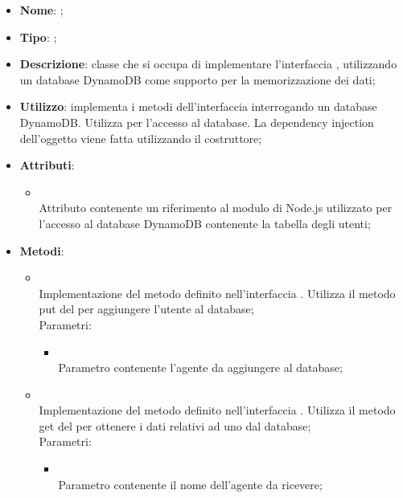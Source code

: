 \begin{itemize}
	\item \textbf{Nome}: ;
	\item \textbf{Tipo}: ;
	\item \textbf{Descrizione}: classe che si occupa di implementare l'interfaccia , utilizzando un database DynamoDB come supporto per la memorizzazione dei dati;
	\item \textbf{Utilizzo}: implementa i metodi dell'interfaccia  interrogando un database DynamoDB. Utilizza  per l'accesso al database. La dependency injection dell'oggetto  viene fatta utilizzando il costruttore;
	\item \textbf{Attributi}:
	\begin{itemize}
		\item[]  \\
		Attributo contenente un riferimento al modulo di Node.js utilizzato per l'accesso al database DynamoDB contenente la tabella degli utenti;
	\end{itemize}
	\item \textbf{Metodi}:
	\begin{itemize}
		\item[]  \\
		Implementazione del metodo definito nell'interfaccia . Utilizza il metodo put del  per aggiungere l'utente al database;\\
		Parametri:
		\begin{itemize}
			\item {} \\
			Parametro contenente l'agente da aggiungere al database;
		\end{itemize}
		\item[]  \\
		Implementazione del metodo definito nell'interfaccia . Utilizza il metodo get del  per ottenere i dati relativi ad uno  dal database;\\
		Parametri:
		\begin{itemize}
			\item {} \\
			Parametro contenente il nome dell'agente da ricevere;
		\end{itemize}

\end{itemize}
\end{itemize}
